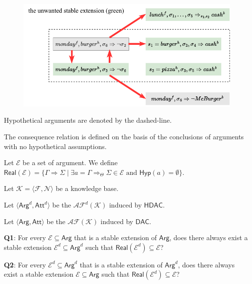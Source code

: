 \documentclass[aspectratio=169]{beamer}
\begin{document}
\begin{frame}
	\begin{figure}
		\centering
		\includegraphics[scale=1]{pic/figure1.pdf}
	\end{figure}
	
	Hypothetical arguments are denoted by the dashed-line.
\end{frame}

\begin{frame}
	The consequence relation is defined on the basis of the conclusions of arguments with no hypothetical assumptions. 
	
	Let \(\mathscr{E}\) be a set of argument. We define 
	$\mathsf{Real}(\mathscr{E})=\{\Gamma\Rightarrow\Sigma\mid \exists a=\Gamma\Rightarrow_{\Theta}\Sigma\in \mathscr{E}\text{ and } \mathsf{Hyp}(a)=\emptyset\}$.
\end{frame}

\begin{frame}
	Let $\mathcal{K}=\langle\mathcal{F},\mathcal{N}\rangle$ be a knowledge base. 
	
	Let $\langle\mathsf{Arg}^d,\mathsf{Att}^d\rangle$ be the $\mathscr{A\!F}^d(\mathcal{K})$ induced by $\mathsf{HDAC}$. 
	
	Let $\langle\mathsf{Arg},\mathsf{Att}\rangle$ be the $\mathscr{A\!F}(\mathcal{K})$ induced by $\mathsf{DAC}$.
	
	\pause
	\vspace{9pt}
	\textbf{Q1}: For every $\mathscr{E}\subseteq\mathsf{Arg}$ that is a stable extension of $\mathsf{Arg}$, does there always exist a stable extension $\mathscr{E}^d\subseteq\mathsf{Arg}^d$ such that $\mathsf{Real}(\mathscr{E}^d)\subseteq\mathscr{E}$?

	\pause
	\vspace{9pt}
	\textbf{Q2}: For every $\mathscr{E}^d\subseteq\mathsf{Arg}^d$ that is a stable extension of $\mathsf{Arg}^d$, does there always exist a stable extension $\mathscr{E}\subseteq\mathsf{Arg}$ such that $\mathsf{Real}(\mathscr{E}^d)\subseteq\mathscr{E}$?
\end{frame}
\end{document}
